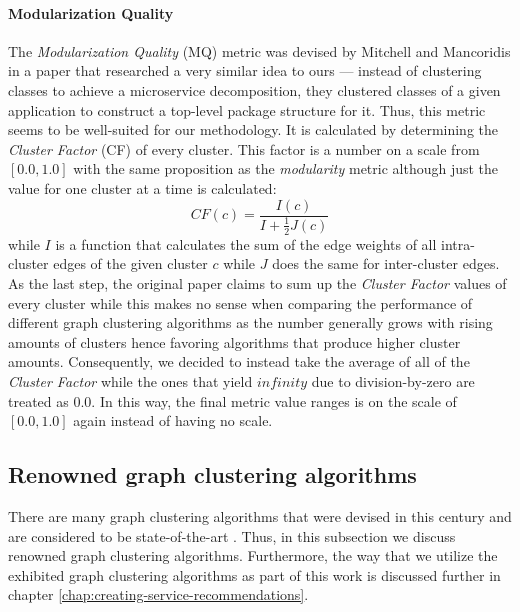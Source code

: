 \documentclass[12pt,a4paper]{report}
\begin{document}
\paragraph{Modularization Quality}
The \textit{Modularization Quality} (MQ) metric was devised by Mitchell and Mancoridis
\cite{mitchell2006automatic} in a paper that researched a very similar idea to ours ---
instead of clustering classes to achieve a microservice decomposition, they clustered
classes of a given application to construct a top\hyp level package structure for it.
Thus, this metric seems to be well\hyp suited for our methodology.
It is calculated by determining the \textit{Cluster Factor} (CF) of every
cluster. This factor is a number on a scale from \([0.0, 1.0]\) with the same
proposition as the \textit{modularity} metric although just the value for one
cluster at a time is calculated:
\[
  CF(c) = \frac{I(c)}{I + \frac{1}{2}J(c)}
\]
while $I$ is a function that calculates the sum of the edge weights of
all intra\hyp cluster edges of the given cluster $c$ while $J$ does the same
for inter\hyp cluster edges.
As the last step, the original paper claims to sum up the \textit{Cluster Factor}
values of every cluster while this makes no sense when comparing the performance
of different graph clustering algorithms as the number generally grows with
rising amounts of clusters hence favoring algorithms that produce higher cluster
amounts. Consequently, we decided to instead take the average of all of the
\textit{Cluster Factor} while the ones that yield $infinity$ due to
division\hyp by\hyp zero are treated as $0.0$. In this way, the final metric value
ranges is on the scale of \([0.0, 1.0]\) again instead of having no scale.


\subsection{Renowned graph clustering algorithms} \label{subsect:renowned-graph-clustering-algorithms}

There are many graph clustering algorithms that were devised in this century
and are considered to be state-of-the-art
\cite{lancichinetti2009community, fortunato2010community, danon2005comparing}.
Thus, in this subsection we discuss renowned graph clustering algorithms.
Furthermore, the way that we utilize the exhibited graph clustering algorithms
as part of this work is discussed further in chapter
\ref{chap:creating-service-recommendations}.
\end{document}
